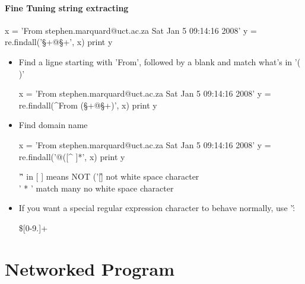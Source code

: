 \documentclass[a4paper,12pt]{report}
\begin{document}
\subsection{Fine Tuning string extracting}
\begin{tcolorbox}
\begin{python}
x = 'From stephen.marquard@uct.ac.za Sat Jan 5 09:14:16 2008'
y = re.findall('\S+@\S+', x)
print y
\end{python}
\end{tcolorbox}

\begin{itemize}
\item Find a ligne starting with 'From', followed by a blank and match what's in '( )'
\begin{tcolorbox}
\begin{python}
x = 'From stephen.marquard@uct.ac.za Sat Jan 5 09:14:16 2008'
y = re.findall(^From (\S+@\S+)', x)
print y
\end{python}
\end{tcolorbox}
\end{itemize}

\begin{itemize}
\item Find domain name
\begin{tcolorbox}
\begin{python}
x = 'From stephen.marquard@uct.ac.za Sat Jan 5 09:14:16 2008'
y = re.findall('@([^ ]*', x)
print y
\end{python}
\end{tcolorbox}
'\^' in [ ] means NOT ('[\^ ] not white space character \\
' * ' match many no white space character
\end{itemize}

\begin{itemize}
\item If you want a special regular expression character to behave normally, use '\': \\
\begin{tcolorbox}
\begin{python}
\$[0-9.]+  %
\end{python}
\end{tcolorbox}
\end{itemize}

\part{Networked Program}
\end{document}
